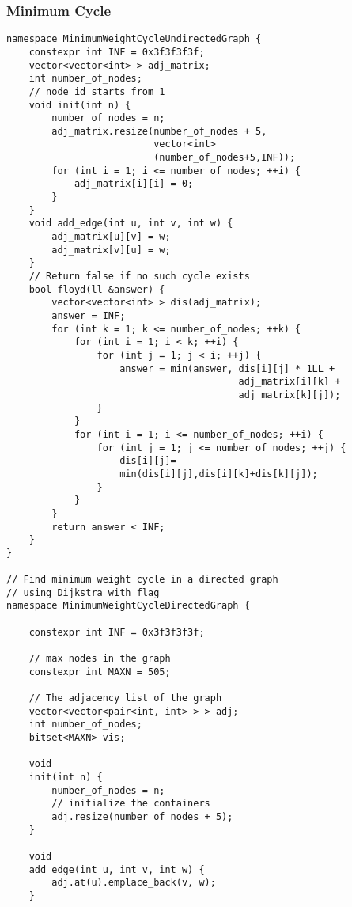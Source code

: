 \documentclass[10pt]{article}{\twocolumn}
\begin{document}
\subsubsection{Minimum Cycle}
\begin{lstlisting}
namespace MinimumWeightCycleUndirectedGraph {
    constexpr int INF = 0x3f3f3f3f;
    vector<vector<int> > adj_matrix;
    int number_of_nodes;
    // node id starts from 1
    void init(int n) {
        number_of_nodes = n;
        adj_matrix.resize(number_of_nodes + 5,
                          vector<int>
                          (number_of_nodes+5,INF));
        for (int i = 1; i <= number_of_nodes; ++i) {
            adj_matrix[i][i] = 0;
        }
    }
    void add_edge(int u, int v, int w) {
        adj_matrix[u][v] = w;
        adj_matrix[v][u] = w;
    }
    // Return false if no such cycle exists
    bool floyd(ll &answer) {
        vector<vector<int> > dis(adj_matrix);
        answer = INF;
        for (int k = 1; k <= number_of_nodes; ++k) {
            for (int i = 1; i < k; ++i) {
                for (int j = 1; j < i; ++j) {
                    answer = min(answer, dis[i][j] * 1LL +
                                         adj_matrix[i][k] +
                                         adj_matrix[k][j]);
                }
            }
            for (int i = 1; i <= number_of_nodes; ++i) {
                for (int j = 1; j <= number_of_nodes; ++j) {
                    dis[i][j]=
                    min(dis[i][j],dis[i][k]+dis[k][j]);
                }
            }
        }
        return answer < INF;
    }
}

// Find minimum weight cycle in a directed graph 
// using Dijkstra with flag
namespace MinimumWeightCycleDirectedGraph {

    constexpr int INF = 0x3f3f3f3f;
    
    // max nodes in the graph
    constexpr int MAXN = 505;

    // The adjacency list of the graph
    vector<vector<pair<int, int> > > adj;
    int number_of_nodes;
    bitset<MAXN> vis;

    void
    init(int n) {
        number_of_nodes = n;
        // initialize the containers
        adj.resize(number_of_nodes + 5);
    }

    void
    add_edge(int u, int v, int w) {
        adj.at(u).emplace_back(v, w);
    }


\end{lstlisting}
\end{document}
